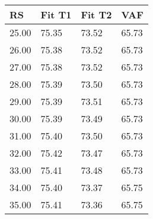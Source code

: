 \begin{tabular}{llll}
RS & Fit T1 & Fit T2 & VAF \\ 
\hline 
25.00 & 75.35 & 73.52 & 65.73 \\ 
26.00 & 75.38 & 73.52 & 65.73 \\ 
27.00 & 75.38 & 73.52 & 65.73 \\ 
28.00 & 75.39 & 73.50 & 65.73 \\ 
29.00 & 75.39 & 73.51 & 65.73 \\ 
30.00 & 75.39 & 73.49 & 65.73 \\ 
31.00 & 75.40 & 73.50 & 65.73 \\ 
32.00 & 75.42 & 73.47 & 65.73 \\ 
33.00 & 75.41 & 73.48 & 65.73 \\ 
34.00 & 75.40 & 73.37 & 65.75 \\ 
35.00 & 75.41 & 73.36 & 65.75 \\ 
\hline 
\end{tabular}